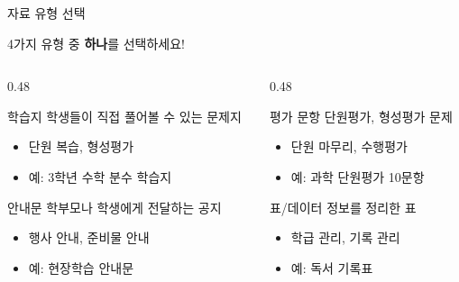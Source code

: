 \documentclass[aspectratio=169, 11pt]{beamer}
\begin{document}
\begin{frame}{자료 유형 선택}
\begin{center}
\Large 4가지 유형 중 \textbf{하나}를 선택하세요!
\end{center}

\vspace{0.3cm}

\begin{columns}[T]
\begin{column}{0.48\textwidth}
\begin{block}{ 학습지}
학생들이 직접 풀어볼 수 있는 문제지
\begin{itemize}
  \item 단원 복습, 형성평가
  \item 예: 3학년 수학 분수 학습지
\end{itemize}
\end{block}

\begin{block}{ 안내문}
학부모나 학생에게 전달하는 공지
\begin{itemize}
  \item 행사 안내, 준비물 안내
  \item 예: 현장학습 안내문
\end{itemize}
\end{block}
\end{column}

\begin{column}{0.48\textwidth}
\begin{block}{ 평가 문항}
단원평가, 형성평가 문제
\begin{itemize}
  \item 단원 마무리, 수행평가
  \item 예: 과학 단원평가 10문항
\end{itemize}
\end{block}

\begin{block}{ 표/데이터}
정보를 정리한 표
\begin{itemize}
  \item 학급 관리, 기록 관리
  \item 예: 독서 기록표
\end{itemize}
\end{block}
\end{column}
\end{columns}
\end{frame}
\end{document}
